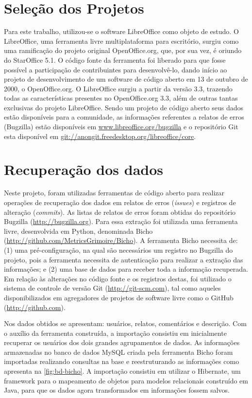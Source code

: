\documentclass[oneside,brazil,a4paper]{normas-utf-tex}
\begin{document}
\section{Seleção dos Projetos}

Para este trabalho, utilizou-se o software LibreOffice como objeto de estudo. O LibreOffice, uma ferramenta livre multiplataforma para escritório, surgiu como uma ramificação do projeto original OpenOffice.org, que, por sua vez, é oriundo do StarOffice 5.1. O código fonte da ferramenta foi liberado para que fosse possível a participação de contribuintes para desenvolvê-lo, dando início ao projeto de desenvolvimento de um software de código aberto em 13 de outubro de 2000, o OpenOffice.org. O LibreOffice surgiu a partir da versão 3.3, trazendo todas as características presentes no OpenOffice.org 3.3, além de outras tantas exclusivas do projeto LibreOffice. Sendo um projeto de código aberto seus dados estão disponíveis para a comunidade, as informações referentes a  relatos de erros (Bugzilla) estão disponíveis em \url{www.libreoffice.org/bugzilla} e o repositório Git esta disponível em \url{git://anongit.freedesktop.org/libreoffice/core}.

\section{Recuperação dos dados}

Neste projeto, foram utilizadas ferramentas de código aberto para realizar operações de 
recuperação dos dados em relatos de erros (\textit{issues}) e registros de alteração (\textit{commits}). As listas de relatos de erros foram  obtidas do repositório Bugzilla (\url{http://bugzilla.org}). Para essa extração foi utilizada uma ferramenta livre, desenvolvida em Python, denominada Bicho (\url{http://github.com/MetricsGrimoire/Bicho}). A ferramenta Bicho necessita de: (1) uma pré-configuração, na qual são necessários um registro no Bugzilla do projeto, pois a ferramenta necessita de autenticação para realizar a extração das informações; e (2) uma base de dados para receber toda a informação recuperada. Em relação às alterações no código fonte e os registros destas, foi utilizado o sistema de controle de versão Git (\url{http://git-scm.com}), tal como aqueles disponibilizados em agregadores de projetos de software livre como o GitHub (\url{http://github.com}). 

Nos dados obtidos se apresentam: usuários, relatos, comentários e descrição. Com o auxílio da ferramenta construída, a importação consistiu em inicialmente recuperar os usuários dos dois grandes agrupamentos de dados. As informações armazenadas no banco de dados MySQL criada pela ferramenta Bicho foram importadas realizando consultas na base e reestruturando as informações como apresenta na \cref{fig:bd-bicho}. A importação consistiu em utilizar o Hibernate, um framework para o mapeamento de objetos para modelos relacionais construído em Java, para que os dados agora transformados em informações fossem salvos. 
\end{document}
